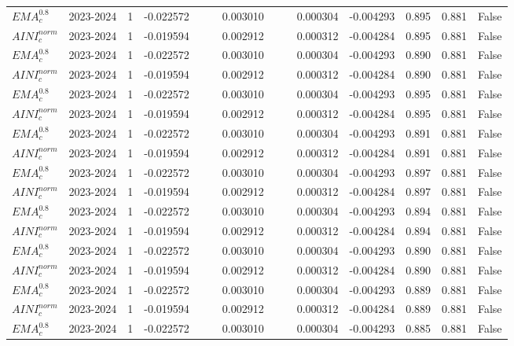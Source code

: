 \begin{tabular}{@{}llrrrrrrrrrlll@{}}
$EMA^{0.8}_{c}$ & 2023-2024 & 1 & -0.022572 &  &  & 0.003010 &  &  & 0.000304 & -0.004293 & 0.895 & 0.881 & False \\
$AINI^{norm}_{c}$ & 2023-2024 & 1 & -0.019594 &  &  & 0.002912 &  &  & 0.000312 & -0.004284 & 0.895 & 0.881 & False \\
$EMA^{0.8}_{c}$ & 2023-2024 & 1 & -0.022572 &  &  & 0.003010 &  &  & 0.000304 & -0.004293 & 0.890 & 0.881 & False \\
$AINI^{norm}_{c}$ & 2023-2024 & 1 & -0.019594 &  &  & 0.002912 &  &  & 0.000312 & -0.004284 & 0.890 & 0.881 & False \\
$EMA^{0.8}_{c}$ & 2023-2024 & 1 & -0.022572 &  &  & 0.003010 &  &  & 0.000304 & -0.004293 & 0.895 & 0.881 & False \\
$AINI^{norm}_{c}$ & 2023-2024 & 1 & -0.019594 &  &  & 0.002912 &  &  & 0.000312 & -0.004284 & 0.895 & 0.881 & False \\
$EMA^{0.8}_{c}$ & 2023-2024 & 1 & -0.022572 &  &  & 0.003010 &  &  & 0.000304 & -0.004293 & 0.891 & 0.881 & False \\
$AINI^{norm}_{c}$ & 2023-2024 & 1 & -0.019594 &  &  & 0.002912 &  &  & 0.000312 & -0.004284 & 0.891 & 0.881 & False \\
$EMA^{0.8}_{c}$ & 2023-2024 & 1 & -0.022572 &  &  & 0.003010 &  &  & 0.000304 & -0.004293 & 0.897 & 0.881 & False \\
$AINI^{norm}_{c}$ & 2023-2024 & 1 & -0.019594 &  &  & 0.002912 &  &  & 0.000312 & -0.004284 & 0.897 & 0.881 & False \\
$EMA^{0.8}_{c}$ & 2023-2024 & 1 & -0.022572 &  &  & 0.003010 &  &  & 0.000304 & -0.004293 & 0.894 & 0.881 & False \\
$AINI^{norm}_{c}$ & 2023-2024 & 1 & -0.019594 &  &  & 0.002912 &  &  & 0.000312 & -0.004284 & 0.894 & 0.881 & False \\
$EMA^{0.8}_{c}$ & 2023-2024 & 1 & -0.022572 &  &  & 0.003010 &  &  & 0.000304 & -0.004293 & 0.890 & 0.881 & False \\
$AINI^{norm}_{c}$ & 2023-2024 & 1 & -0.019594 &  &  & 0.002912 &  &  & 0.000312 & -0.004284 & 0.890 & 0.881 & False \\
$EMA^{0.8}_{c}$ & 2023-2024 & 1 & -0.022572 &  &  & 0.003010 &  &  & 0.000304 & -0.004293 & 0.889 & 0.881 & False \\
$AINI^{norm}_{c}$ & 2023-2024 & 1 & -0.019594 &  &  & 0.002912 &  &  & 0.000312 & -0.004284 & 0.889 & 0.881 & False \\
$EMA^{0.8}_{c}$ & 2023-2024 & 1 & -0.022572 &  &  & 0.003010 &  &  & 0.000304 & -0.004293 & 0.885 & 0.881 & False \\

\end{tabular}
